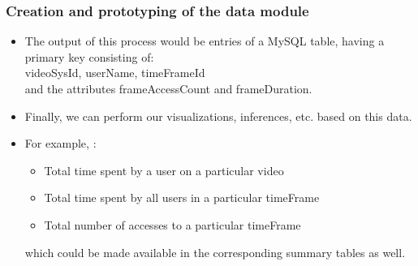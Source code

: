 \documentclass[12pt,xcolor=dvipsnames]{beamer}
\begin{document}
\begin{frame}[t]
\frametitle{Creation and prototyping of the data module}

\begin{itemize}
\item The output of this process would be entries of a MySQL table, having a primary key consisting of:\\videoSysId, userName, timeFrameId\\and the attributes frameAccessCount and frameDuration.

\item Finally, we can perform our visualizations, inferences, etc. based on this data.

\item For example, :

\begin{itemize}
\item Total time spent by a user on a particular video
\item Total time spent by all users in a particular timeFrame
\item Total number of accesses to a particular timeFrame
\end{itemize}

which could be made available in the corresponding summary tables as well.
\end{itemize}

\end{frame}
\end{document}
